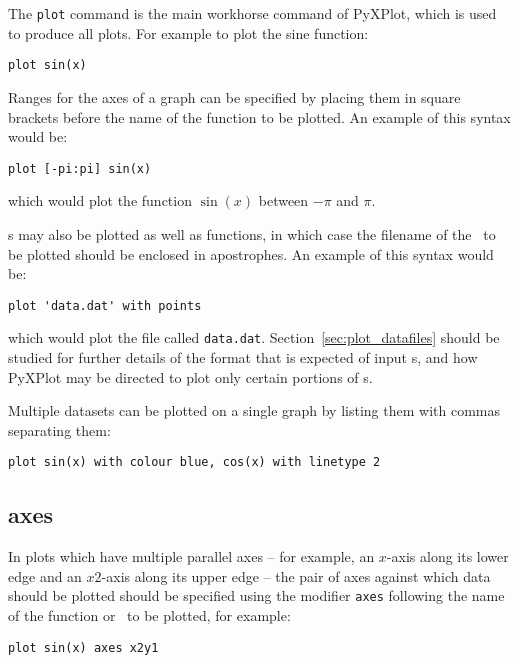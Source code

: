 The {\tt plot} command is the main workhorse command of PyXPlot, which is used
to produce all plots. For example to plot the sine function:

\begin{verbatim}
plot sin(x)
\end{verbatim}

Ranges for the axes of a graph can be specified by placing them in
square brackets before the name of the function to be plotted. An example of
this syntax would be:

\begin{verbatim}
plot [-pi:pi] sin(x)
\end{verbatim}

\noindent which would plot the function $\sin(x)$ between $-\pi$ and $\pi$.

\Datafile s may also be plotted as well as functions, in which case the filename
of the \datafile\ to be plotted should be enclosed in apostrophes. An example of
this syntax would be:

\begin{verbatim}
plot 'data.dat' with points
\end{verbatim}

\noindent which would plot the file called {\tt data.dat}.
Section~\ref{sec:plot_datafiles} should be studied for further details of the
format that is expected of input \datafile s, and how PyXPlot may be directed
to plot only certain portions of \datafile s.

Multiple datasets can be plotted on a single graph by listing them with commas
separating them:

\begin{verbatim}
plot sin(x) with colour blue, cos(x) with linetype 2
\end{verbatim}

\subsection{axes}

In plots which have multiple parallel axes -- for example, an $x$-axis along its
lower edge and an $x2$-axis along its upper edge -- the pair of axes against
which data should be plotted should be specified using the modifier {\tt axes}
following the name of the function or \datafile\ to be plotted, for example:

\begin{verbatim}
plot sin(x) axes x2y1
\end{verbatim}

